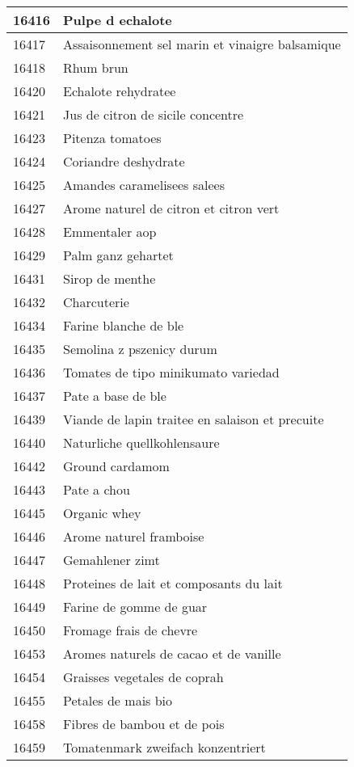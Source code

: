 \begin{longtable}{|l|l|}
16416 & Pulpe d echalote \\ \hline 
16417 & Assaisonnement sel marin et vinaigre balsamique \\ \hline 
16418 & Rhum brun \\ \hline 
16420 & Echalote rehydratee \\ \hline 
16421 & Jus de citron de sicile concentre \\ \hline 
16423 & Pitenza tomatoes \\ \hline 
16424 & Coriandre deshydrate \\ \hline 
16425 & Amandes caramelisees salees \\ \hline 
16427 & Arome naturel de citron et citron vert \\ \hline 
16428 & Emmentaler aop \\ \hline 
16429 & Palm ganz gehartet \\ \hline 
16431 & Sirop de menthe \\ \hline 
16432 & Charcuterie \\ \hline 
16434 & Farine blanche de ble \\ \hline 
16435 & Semolina z pszenicy durum \\ \hline 
16436 & Tomates de tipo minikumato variedad \\ \hline 
16437 & Pate a base de ble \\ \hline 
16439 & Viande de lapin traitee en salaison et precuite \\ \hline 
16440 & Naturliche quellkohlensaure \\ \hline 
16442 & Ground cardamom \\ \hline 
16443 & Pate a chou \\ \hline 
16445 & Organic whey \\ \hline 
16446 & Arome naturel framboise \\ \hline 
16447 & Gemahlener zimt \\ \hline 
16448 & Proteines de lait et composants du lait \\ \hline 
16449 & Farine de gomme de guar \\ \hline 
16450 & Fromage frais de chevre \\ \hline 
16453 & Aromes naturels de cacao et de vanille \\ \hline 
16454 & Graisses vegetales de coprah \\ \hline 
16455 & Petales de mais bio \\ \hline 
16458 & Fibres de bambou et de pois \\ \hline 
16459 & Tomatenmark zweifach konzentriert \\ \hline 

\end{longtable}
